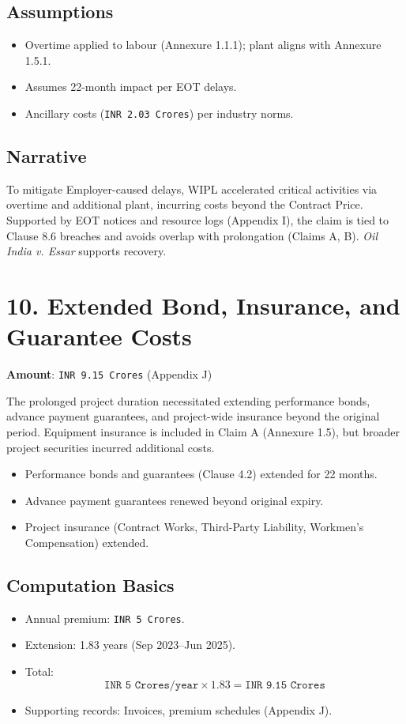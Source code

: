 \documentclass[12pt,letterpaper]{article}
\begin{document}
	\subsection*{Assumptions}
	\begin{itemize}
		\item Overtime applied to labour (Annexure 1.1.1); plant aligns with Annexure 1.5.1.
		\item Assumes 22-month impact per EOT delays.
		\item Ancillary costs (\texttt{INR 2.03 Crores}) per industry norms.
	\end{itemize}
	
	\subsection*{Narrative}
	To mitigate Employer-caused delays, WIPL accelerated critical activities via overtime and additional plant, incurring costs beyond the Contract Price. Supported by EOT notices and resource logs (Appendix I), the claim is tied to Clause 8.6 breaches and avoids overlap with prolongation (Claims A, B). \textit{Oil India v. Essar} supports recovery.
	
	\section*{10. Extended Bond, Insurance, and Guarantee Costs}
	\textbf{Amount}: \texttt{INR 9.15 Crores} (Appendix J)
	
	The prolonged project duration necessitated extending performance bonds, advance payment guarantees, and project-wide insurance beyond the original period. Equipment insurance is included in Claim A (Annexure 1.5), but broader project securities incurred additional costs.
	
	\begin{itemize}
		\item Performance bonds and guarantees (Clause 4.2) extended for 22 months.
		\item Advance payment guarantees renewed beyond original expiry.
		\item Project insurance (Contract Works, Third-Party Liability, Workmen’s Compensation) extended.
	\end{itemize}
	
	\subsection*{Computation Basics}
	\begin{itemize}
		\item Annual premium: \texttt{INR 5 Crores}.
		\item Extension: 1.83 years (Sep 2023--Jun 2025).
		\item Total:
		\[
		\texttt{INR 5 Crores/year} \times 1.83 = \texttt{INR 9.15 Crores}
		\]
		\item Supporting records: Invoices, premium schedules (Appendix J).
	\end{itemize}
	
\end{document}
